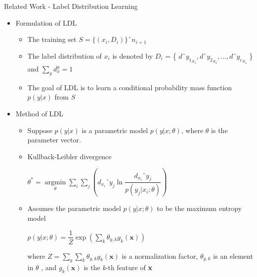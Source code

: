 \documentclass[
 size=14pt,
 paper=smartboard,  %
 mode=present, 		%
 display=slides, 	%
 style=tuliplab,  	%
 pauseslide,
 fleqn,leqno]{powerdot}
\begin{document}
	\begin{slide}{Related Work - Label Distribution Learning}
	
	\begin{itemize}
		\item 
		Formulation of LDL
		
		\begin{itemize}
			\item 
			The training set $ S = \{ ( x_{i} , D_{i} )  \} ˆn_{ i = 1 } $
			\item 
			The label distribution of $ x_{i}  $ is denoted by 
			$ D_{i} $ = \{ 
			$ d ˆ {y_{1}} _{ x_{i} } , 
			d ˆ {y_{2}} _{ x_{i} } ,...,
			d ˆ {y_{c}} _{ x_{i} }  $ \}
			and 
			$ \sum_{y}  d^y_{x} = 1 $
			\item 
			The goal of LDL is to 
			learn a conditional probability mass function 
			$ p(y|x) $ from $ S $
		\end{itemize}
		
		\item 
		Method of LDL
		
		\begin{itemize}
			\item 
			Suppose $ p(y|x) $  is a parametric model
			$ p(y|x;{\theta}) $, 
			where $ \theta $ is the parameter vector. 
			\item 
			Kullback-Leibler divergence	
			
			$ \theta ^{\ast} = 
			\mathop{\arg\min}\limits_{\theta}
			\sum\limits_{i}
			\sum\limits_{j}
			( d_{ x_{ i } } ˆ{ y_{ j } }
			\ln \dfrac{ d_{ x_{ i } } ˆ{ y_{ j } } }{ p( y_{ j } | x_{ i } ;{\theta}) }
			)$	
			\item 
			Assumes the parametric model 
			$ p(y|x;{\theta}) $ 
			to be the maximum entropy model	
			
			$ p(y|x;{\theta}) = \dfrac{1}{Z}
			\exp ( \sum\limits_{k}
			{\theta}_{y,k} 
			g_{k}( \textbf{x})  ) $ 
			
			where $ Z = \sum _{y}
			\sum_{k}  {\theta}_{y,k}  g_{k}( \textbf{x}) $
			is a normalization factor,
			$ {\theta}_{y,k} $ is an element in \textbf {$\theta$} ,
			and $ g_{k}( \textbf{x}) $ is the \textit{k}-th feature of \textbf{ x }
		\end{itemize}
		
	\end{itemize}
	
\end{slide}
\end{document}
